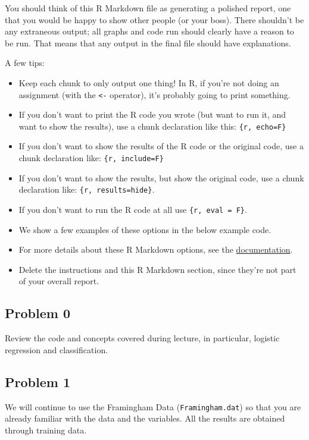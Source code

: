 \documentclass[]{article}
\providecommand{\tightlist}{%
  \setlength{\itemsep}{0pt}\setlength{\parskip}{0pt}}
\begin{document}
You should think of this R Markdown file as generating a polished
report, one that you would be happy to show other people (or your boss).
There shouldn't be any extraneous output; all graphs and code run should
clearly have a reason to be run. That means that any output in the final
file should have explanations.

A few tips:

\begin{itemize}
\tightlist
\item
  Keep each chunk to only output one thing! In R, if you're not doing an
  assignment (with the \texttt{\textless{}-} operator), it's probably
  going to print something.
\item
  If you don't want to print the R code you wrote (but want to run it,
  and want to show the results), use a chunk declaration like this:
  \texttt{\{r,\ echo=F\}}
\item
  If you don't want to show the results of the R code or the original
  code, use a chunk declaration like: \texttt{\{r,\ include=F\}}
\item
  If you don't want to show the results, but show the original code, use
  a chunk declaration like:
  \texttt{\{r,\ results=\textquotesingle{}hide\textquotesingle{}\}}.
\item
  If you don't want to run the R code at all use
  \texttt{\{r,\ eval\ =\ F\}}.
\item
  We show a few examples of these options in the below example code.
\item
  For more details about these R Markdown options, see the
  \href{http://yihui.name/knitr/options/}{documentation}.
\item
  Delete the instructions and this R Markdown section, since they're not
  part of your overall report.
\end{itemize}

\subsection{Problem 0}\label{problem-0}

Review the code and concepts covered during lecture, in particular,
logistic regression and classification.

\subsection{Problem 1}\label{problem-1}

We will continue to use the Framingham Data (\texttt{Framingham.dat}) so
that you are already familiar with the data and the variables. All the
results are obtained through training data.
\end{document}
